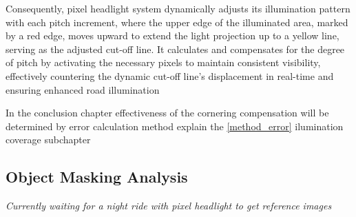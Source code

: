 Consequently, pixel headlight system dynamically adjusts its illumination pattern with each pitch increment, where the upper edge of the illuminated area, marked by a red edge, moves upward to extend the light projection up to a yellow line, serving as the adjusted cut-off line. It calculates and compensates for the degree of pitch by activating the necessary pixels to maintain consistent visibility, effectively countering the dynamic cut-off line's displacement in real-time and ensuring enhanced road illumination 

In the conclusion chapter effectiveness of the cornering compensation will be determined by error calculation method explain the \ref{method_error} ilumination coverage subchapter


\subsection{Object Masking Analysis}
\textit{Currently waiting for a night ride with pixel headlight to get reference images}

